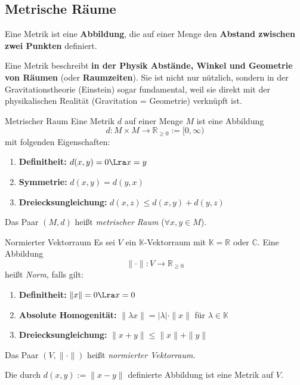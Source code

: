 \newpage
\subsection{Metrische Räume}

Eine Metrik ist eine \textbf{Abbildung}, die auf einer Menge den \textbf{Abstand zwischen zwei Punkten} definiert.

Eine Metrik beschreibt \textbf{in der Physik Abstände, Winkel und Geometrie von Räumen} (oder \textbf{Raumzeiten}). Sie ist nicht nur nützlich, sondern in der Gravitationstheorie (Einstein) sogar fundamental, weil sie direkt mit der physikalischen Realität (Gravitation = Geometrie) verknüpft ist.

\begin{definition}{Metrischer Raum}
Eine Metrik $d$ auf einer Menge $M$ ist eine Abbildung
$$
    d: M \times M \to \mathbb{R}_{\geq 0} := [0, \infty)
$$
mit folgenden Eigenschaften:
\begin{enumerate}
    \item[(M1)] \textbf{Definitheit:} $d(x, y) = 0 \Lra x = y$
    \item[(M2)] \textbf{Symmetrie:} $d(x, y) = d(y, x)$
    \item[(M3)] \textbf{Dreiecksungleichung:} $d(x, z) \leq d(x, y) + d(y, z)$
\end{enumerate}
Das Paar $(M, d)$ heißt \emph{metrischer Raum} ($\forall x,y \in M$).
\end{definition}

\vspace{1em}

\begin{definition}{Normierter Vektorraum}
Es sei $V$ ein $\mathbb{K}$-Vektorraum mit $\mathbb{K} = \mathbb{R}$ oder $\mathbb{C}$. Eine Abbildung
$$
    \| \cdot \| : V \to \mathbb{R}_{\geq 0}
$$
heißt \emph{Norm}, falls gilt:
\begin{enumerate}
    \item[(N1)] \textbf{Definitheit:} $\|x\| = 0 \Lra x = 0$
    \item[(N2)] \textbf{Absolute Homogenität:} $\|\lambda x\| = |\lambda| \cdot \|x\|$ für $\lambda \in \mathbb{K}$
    \item[(N3)] \textbf{Dreiecksungleichung:} $\|x + y\| \leq \|x\| + \|y\|$
\end{enumerate}
Das Paar $(V, \| \cdot \|)$ heißt \emph{normierter Vektorraum}.
\end{definition}

Die durch $d(x, y) := \|x - y\|$ definierte Abbildung ist eine Metrik auf $V$.

